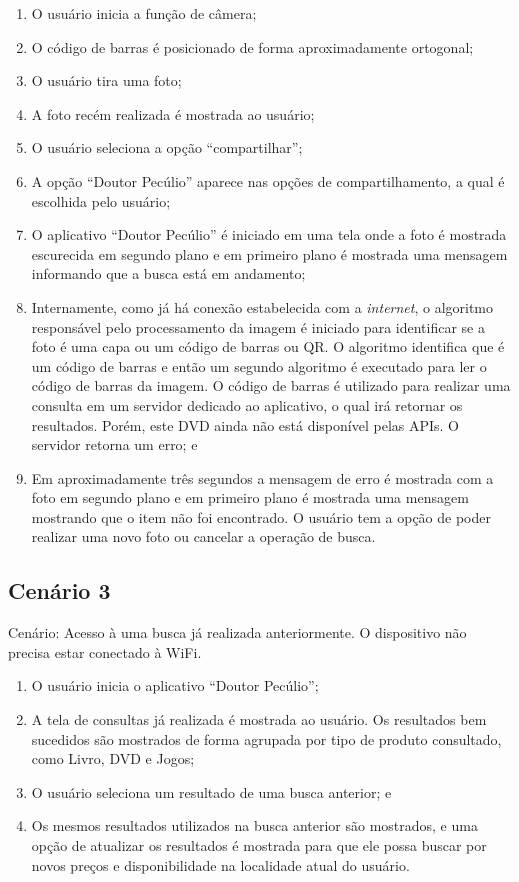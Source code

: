 \begin{enumerate}
\item O usuário inicia a função de câmera;
\item O código de barras é posicionado de forma aproximadamente ortogonal;
\item O usuário tira uma foto;
\item A foto recém realizada é mostrada ao usuário;
\item O usuário seleciona a opção ``compartilhar'';
\item A opção ``Doutor Pecúlio'' aparece nas opções de compartilhamento,
    a qual é escolhida pelo usuário;
\item O aplicativo ``Doutor Pecúlio'' é iniciado em uma tela onde a foto
    é mostrada escurecida em segundo plano e em primeiro plano é mostrada uma
    mensagem informando que a busca está em andamento;
\item Internamente, como já há conexão estabelecida com a \emph{internet}, o
    algoritmo responsável pelo processamento da imagem é iniciado para identificar
    se a foto é uma capa ou um código de barras ou QR.  O algoritmo identifica que 
    é um código de barras e então um segundo algoritmo é executado para ler o
    código de barras da imagem.   O código de barras é
    utilizado para realizar uma consulta em um servidor dedicado ao aplicativo,
    o qual irá retornar os resultados.  Porém, este DVD ainda não está disponível
    pelas APIs.  O servidor retorna um erro; e
\item Em aproximadamente três segundos a mensagem de erro é mostrada com a
    foto em segundo plano e em primeiro plano é mostrada uma mensagem mostrando
    que o item não foi encontrado.  O usuário tem a opção de poder realizar 
    uma novo foto ou cancelar a operação de busca.
\end{enumerate}

\subsection{Cenário 3} \label{cenario3}

Cenário: Acesso à uma busca já realizada anteriormente.  O dispositivo
não precisa estar conectado à WiFi.

\begin{enumerate}
\item O usuário inicia o aplicativo ``Doutor Pecúlio'';
\item A tela de consultas já realizada é mostrada ao usuário.  Os
    resultados bem sucedidos são mostrados de forma agrupada por tipo 
    de produto consultado, como Livro, DVD e Jogos;
\item O usuário seleciona um resultado de uma busca anterior; e
\item Os mesmos resultados utilizados na busca anterior são mostrados,
    e uma opção de atualizar os resultados é mostrada para que ele possa
    buscar por novos preços e disponibilidade na localidade atual do
    usuário.
\end{enumerate}
